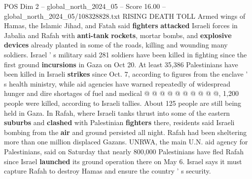 \begin{textsample}{POS Dim 2 – global\_north\_2024\_05 – Score 16.00 – global\_north\_2024\_05/108328828.txt}
RISING DEATH TOLL Armed wings of Hamas, the Islamic Jihad, and Fatah said \textbf{fighters} \textbf{attacked} Israeli forces in Jabalia and Rafah with \textbf{anti-tank} \textbf{rockets}, mortar bombs, and \textbf{explosive} \textbf{devices} already planted in some of the roads, killing and wounding many soldiers.
Israel ' s military said 281 soldiers have been killed in fighting since the first ground \textbf{incursions} in Gaza on Oct 20.
At least 35,386 Palestinians have been killed in Israeli \textbf{strikes} since Oct. 7, according to figures from the enclave ' s health ministry, while aid agencies have warned repeatedly of widespread hunger and dire shortages of fuel and medical @ @ @ @ @ @ @ @ @ @, 1,200 people were killed, according to Israeli tallies.
About 125 people are still being held in Gaza.
In Rafah, where Israeli tanks thrust into some of the eastern \textbf{suburbs} and \textbf{clashed} with Palestinian \textbf{fighters} there, residents said Israeli bombing from the \textbf{air} and ground persisted all night.
Rafah had been sheltering more than one million displaced Gazans.
UNRWA, the main U.N. aid agency for Palestinians, said on Saturday that nearly 800,000 Palestinians have fled Rafah since Israel \textbf{launched} its ground operation there on May 6.
Israel says it must capture Rafah to destroy Hamas and ensure the country ' s security.

\end{textsample}
